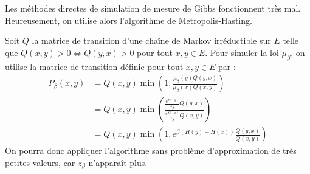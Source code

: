 Les méthodes directes de simulation de mesure de Gibbs fonctionnent très mal. 
Heureusement, on utilise alors l'algorithme de Metropolis-Hasting.

\begin{remark}
    Soit $Q$ la matrice de transition d'une chaîne de Markov irréductible 
    sur $E$ telle que $Q(x,y) > 0 \iff Q(y,x) > 0$ pour tout $x,y \in E$.
    Pour simuler la loi $ \mu_\beta$, on utilise la matrice de transition 
    définie pour tout $x,y \in E$ par : 
        \begin{align}
            P_\beta (x,y) &= Q(x,y) \min \left( 1, \frac{ \mu_\beta (y) Q(y,x)}{ \mu_\beta(x) Q(x,y)}\right) \\ 
            &= Q(x,y) \min \left( \frac{ \frac{e^{ \beta H(y)}}{ z_\beta} Q(y,x)}{ \frac{e^{ \beta H(x)}}{ z_\beta} Q(x,y)} \right) \\ 
            &= Q(x,y) \min \left( 1, e^{\beta (H(y) - H(x))} \frac{Q(y,x)}{Q(x,y)}\right) \label{eq:calcul-annulation-gibbs}
        \end{align}
    On pourra donc appliquer l'algorithme sans problème d'approximation 
    de très petites valeurs, car $z_\beta$ n'apparaît plus.
\end{remark}

